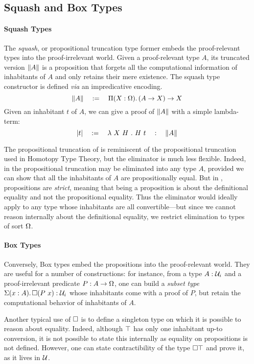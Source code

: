 \subsection{Squash and Box Types}

\paragraph*{Squash Types}

The \emph{squash}, or propositional truncation type former embeds the 
proof-relevant types into the proof-irrelevant world.
% 
Given a proof-relevant type \( A \), its truncated version \( \Squash{A} \) is a
proposition that forgets all the computational information of inhabitants of
\( A \) and only retains their mere existence.
% 
The squash type constructor is defined \textit{via} an impredicative encoding.
\[
	\Squash{A} \quad := \quad \Depfun[X]{\sProp}{\Fun{(\Fun{A}{X})}{X}}
\]
Given an inhabitant \( t \) of \( A \), we can give a proof of \( \Squash{A} \)
with a simple lambda-term: 
\[
	\squash{t} \quad := \quad \lambda\ X\ H\ .\ H\ t \quad : \quad \Squash{A}
\]

The propositional truncation of \SetoidCC is reminiscent of the
propositional truncation used in Homotopy Type Theory, but the eliminator
is much less flexible.
% 
Indeed, in \HoTT the propositional truncation may be eliminated into any type 
\( A \), provided we can show that all the inhabitants of \( A \) are 
propositionally equal.
% 
But in \SetoidCC, propositions are \emph{strict}, meaning that being a 
proposition is about the definitional equality and not the propositional 
equality. 
% 
Thus the eliminator would ideally apply to any type whose inhabitants are 
all convertible---but since we cannot reason internally about the definitional
equality, we restrict elimination to types of sort \( \sProp \).

\paragraph*{Box Types}
% 
Conversely, Box types embed the propositions into the proof-relevant world.
They are useful for a number of constructions: for instance, from a type \( \tm{A}{\Type_i} \) and a
proof-irrelevant predicate \( \tm{P}{\Fun{A}{\sProp}} \), one can build a \emph{subset type}
\( \tm{\Sig{A}{\Boxt{(P\ x)}}}{\Type_i} \) whose inhabitants come with a proof of \( P \), but
retain the computational behavior of inhabitants of \( A \).

Another typical use of $\Boxt{}$ is to define a singleton
  type on which it is possible to reason about equality. Indeed, although
  $\Unit$ has only one inhabitant up-to conversion, it is not possible
  to state this internally as equality on propositions is not defined.
  However, one can state contractibility of the type $\Boxt{\Unit}$ and prove
  it, as it lives in $\Type$.


